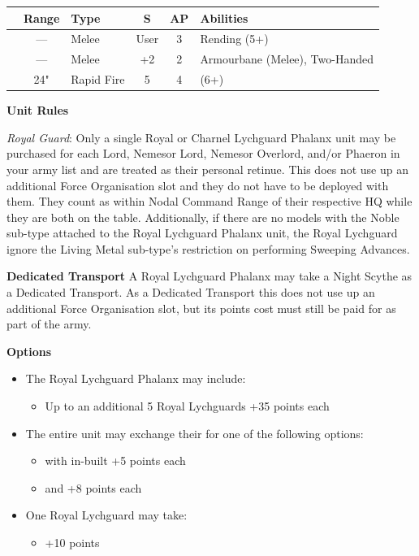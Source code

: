 \begin{minipage}[t]{0.72\textwidth}
	\begin{tabular}{L{90 pt} c C{40pt} *{2}{c} >{\raggedright\arraybackslash}p{130pt}}
		& Range & Type & S & AP & Abilities \\
		\hline
		 & — & Melee & User & 3 & Rending (5+) \\
		 & — & Melee & +2 & 2 & Armourbane (Melee), Two-Handed \\
		 & 24" & Rapid Fire & 5 & 4 &  (6+) \\
	\end{tabular}
	
	\vspace*{2em}
	\textbf{Unit Rules}
	
	\textit{Royal Guard}: Only a single Royal or Charnel Lychguard Phalanx unit may be purchased for each Lord, Nemesor Lord, Nemesor Overlord, and/or Phaeron in your army list and are treated as their personal retinue. This does not use up an additional Force Organisation slot and they do not have to be deployed with them. They count as within Nodal Command Range of their respective HQ while they are both on the table. Additionally, if there are no models with the Noble sub-type attached to the Royal Lychguard Phalanx unit, the Royal Lychguard ignore the Living Metal sub-type's restriction on performing Sweeping Advances.
	
	\vspace*{2em}
	\textbf{Dedicated Transport}
	A Royal Lychguard Phalanx may take a Night Scythe as a Dedicated Transport. As a Dedicated Transport this does not use up an additional Force Organisation slot, but its points cost must still be paid for as part of the army.
	
	\vspace*{2em}
	\textbf{Options}
	\begin{itemize}
		\item The Royal Lychguard Phalanx may include:
		\begin{itemize}
			\item Up to an additional 5 Royal Lychguards \dotfill +35 points each
		\end{itemize}
		\item The entire unit may exchange their  for one of the following options:
		\begin{itemize}
			\item {} with in-built  \dotfill +5 points each
			\item {} and  \dotfill +8 points each
		\end{itemize}
		\item One Royal Lychguard may take:
		\begin{itemize}
			\item {} \dotfill +10 points
		\end{itemize} 
	\end{itemize}
\end{minipage}
